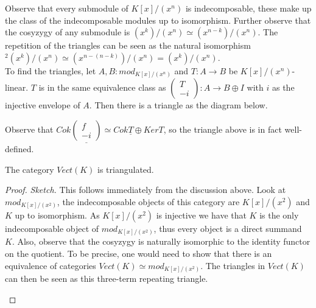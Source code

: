     Observe that every submodule of $K[x]/(x^n)$ is indecomposable, these make up the class of the indecomposable modules up to isomorphism. Further observe that the cosyzygy of any submodule is \upside{$\Omega$}$(x^k)/(x^n)\simeq (x^{n-k})/(x^n)$. The repetition of the triangles can be seen as the natural isomorphism \upside{$\Omega$}$^2(x^k)/(x^n)\simeq (x^{n-(n-k)})/(x^n) = (x^k)/(x^n)$. \\

    To find the triangles, let $A,B:mod_{K[x]/(x^n)}$ and $T:A\rightarrow B$ be $K[x]/(x^n)$-linear. $T$ is in the same equivalence class as $\begin{pmatrix} T \\ -i \end{pmatrix}:A\rightarrow B\oplus I$ with $i$ as the injective envelope of $A$. Then there is a triangle as the diagram below.

    \begin{center}
    \end{center}

    Observe that $Cok\underline{\begin{pmatrix} f \\ -i \end{pmatrix}} \simeq Cok\underline{T}\oplus Ker$\underline{\upside{$\Omega$}$T$}, so the triangle above is in fact well-defined.

    \begin{lemma}
        The category $Vect(K)$ is triangulated.
    \end{lemma}

    \begin{proof}\emph{Sketch.} This follows immediately from the discussion above. Look at $mod_{K[x]/(x^2)}$, the indecomposable objects of this category are $K[x]/(x^2)$ and $K$ up to isomorphism. As $K[x]/(x^2)$ is injective we have that $K$ is the only indecomposable object of \underline{$mod_{K[x]/(x^2)}$}, thus every object is a direct summand $K$. Also, observe that the cosyzygy is naturally isomorphic to the identity functor on the quotient. To be precise, one would need to show that there is an equivalence of categories $Vect(K)\simeq mod_{K[x]/(x^2)}$. The triangles in $Vect(K)$ can then be seen as this three-term repeating triangle.
        \begin{center}
        \end{center}
    \end{proof}

